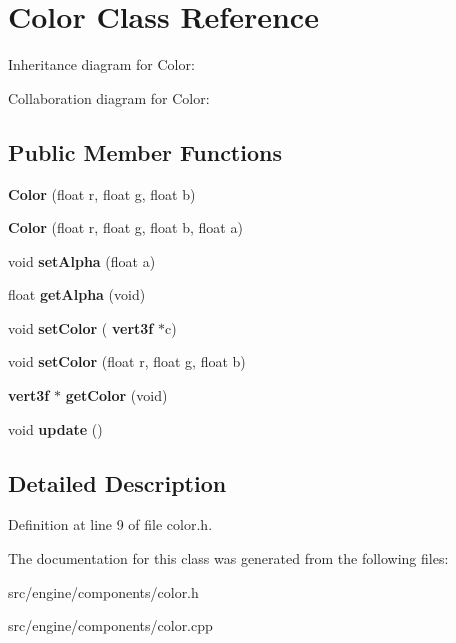 \section{Color Class Reference}
\label{class_color}


Inheritance diagram for Color\+:


Collaboration diagram for Color\+:
\subsection*{Public Member Functions}
\begin{DoxyCompactItemize}
\item 
\mbox{\label{class_color_a373c542c99fb83ce9c7c08aae76b2718}} 
{\bfseries Color} (float r, float g, float b)
\item 
\mbox{\label{class_color_a6e4627389673c8b5cce81bf3eec79938}} 
{\bfseries Color} (float r, float g, float b, float a)
\item 
\mbox{\label{class_color_af1924c092cfd463211993a884a0db7de}} 
void {\bfseries set\+Alpha} (float a)
\item 
\mbox{\label{class_color_a89661fe968e59cfb06bbc2067390d989}} 
float {\bfseries get\+Alpha} (void)
\item 
\mbox{\label{class_color_a216dcf3fd534a7285f0de1111331b076}} 
void {\bfseries set\+Color} (\textbf{ vert3f} $\ast$c)
\item 
\mbox{\label{class_color_ac1fcaeadc6072c342bd6b8b81bfed000}} 
void {\bfseries set\+Color} (float r, float g, float b)
\item 
\mbox{\label{class_color_a99dd4e0813a02073c652707a88c4f7c7}} 
\textbf{ vert3f} $\ast$ {\bfseries get\+Color} (void)
\item 
\mbox{\label{class_color_ae1a27152a6cbc5de0f0b8744414a8aa1}} 
void {\bfseries update} ()
\end{DoxyCompactItemize}


\subsection{Detailed Description}


Definition at line 9 of file color.\+h.



The documentation for this class was generated from the following files\+:\begin{DoxyCompactItemize}
\item 
src/engine/components/color.\+h\item 
src/engine/components/color.\+cpp\end{DoxyCompactItemize}

